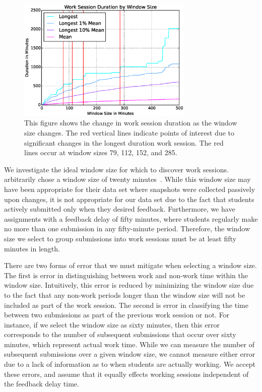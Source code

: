 \begin{figure}[!t]
\centering \includegraphics[width=3.3in]{graphs/Work_Session_Duration_by_Window_Size.eps}
\caption{This figure shows the change in work session duration as the window
  size changes. The red vertical lines indicate points of interest due to
  significant changes in the longest duration work session. The red lines occur
  at window sizes 79, 112, 152, and 285.}
\end{figure}

We investigate the ideal window size for which to discover work
sessions. \spacco{} arbitrarily chose a window size of twenty
minutes~\cite{Spacco:2013:TIP:2462476.2465594}. While this window size may have
been appropriate for their data set where snapshots were collected passively
upon changes, it is not appropriate for our data set due to the fact that
students actively submitted only when they desired feedback. Furthermore, we
have assignments with a feedback delay of fifty minutes, where students
regularly make no more than one submission in any fifty-minute
period. Therefore, the window size we select to group submissions into work
sessions must be at least fifty minutes in length.

There are two forms of error that we must mitigate when selecting a window
size. The first is error in distinguishing between work and non-work time
within the window size. Intuitively, this error is reduced by minimizing the
window size due to the fact that any non-work periods longer than the window
size will not be included as part of the work session. The second is error in
classifying the time between two submissions as part of the previous work
session or not. For instance, if we select the window size as sixty minutes,
then this error corresponds to the number of subsequent submissions that occur
over sixty minutes, which represent actual work time. While we can measure the
number of subsequent submissions over a given window size, we cannot measure
either error due to a lack of information as to when students are actually
working. We accept these errors, and assume that it equally effects working
sessions independent of the feedback delay time.

